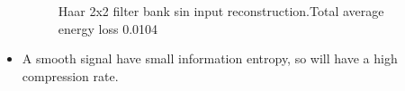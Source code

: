 \documentclass{beamer}
\begin{document}
\begin{frame}
\begin{itemize}
\begin{figure}[ht!]
\begin{minipage}{0.45\textwidth}
                      \caption{Haar 2x2 filter bank sin input reconstruction.Total average energy loss 0.0104}
                  \end{minipage}
              \end{figure}
        \item A smooth signal have small information entropy, so will have a high compression rate.
    \end{itemize}
\end{frame}
\end{document}
